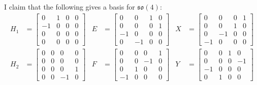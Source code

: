 \begin{example}
	I claim that the following gives a basis for $\mathfrak{so}(4)$:
	\begin{align*}
		H_1 & = \begin{bmatrix} 
			0 & 1 & 0 & 0 \\
			-1 & 0 & 0 & 0 \\
			0 & 0 & 0 & 0 \\
			0 & 0 & 0 & 0 \end{bmatrix} & 
		E & = \begin{bmatrix}
			0 & 0 & 1 & 0 \\
			0 & 0 & 0 & 1 \\
			-1 & 0 & 0 & 0 \\
			0 & -1 & 0 & 0
 		\end{bmatrix} & 
		X & = \begin{bmatrix}
			0 & 0 & 0 & 1 \\
			0 & 0 & 1 & 0 \\
			0 & -1 & 0 & 0 \\
			-1 & 0 & 0 & 0
		\end{bmatrix} \\
		H_2 & = \begin{bmatrix} 
		   	0 & 0 & 0 & 0 \\
		   	0 & 0 & 0 & 0 \\
		   	0 & 0 & 0 & 1 \\
		   	0 & 0 & -1 & 0 \end{bmatrix} & 
		F & = \begin{bmatrix}
			0 & 0 & 0 & 1 \\
			0 & 0 & -1 & 0 \\
			0 & 1 & 0 & 0 \\
			-1 & 0 & 0 & 0
 		\end{bmatrix} & 
		Y & = \begin{bmatrix}
		    0 & 0 & 1 & 0 \\
		    0 & 0 & 0 & -1 \\
		    -1 & 0 & 0 & 0 \\
		    0 & 1 & 0 & 0
		\end{bmatrix}
	\end{align*}
	

\end{example}
